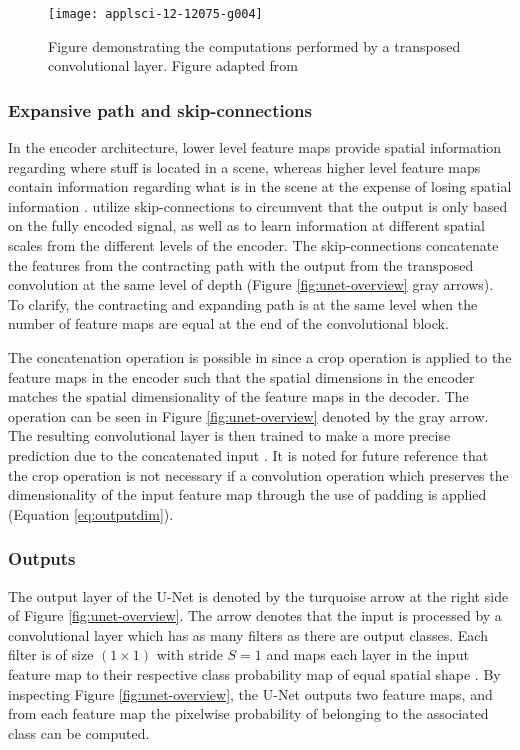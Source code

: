 \documentclass[../main/thesis.tex]{subfiles}
\begin{document}
\begin{figure}
    \centering
    \texttt{[image: applsci-12-12075-g004]}
    \caption{\label{fig:tconv}Figure demonstrating the computations performed by a transposed convolutional layer. Figure adapted from \protect\citet{Wu2022}}
\end{figure}

\subsubsection{Expansive path and skip-connections}
In the encoder architecture, lower level feature maps provide spatial information regarding where stuff is located in a scene, whereas higher level feature maps contain information regarding what is in the scene at the expense of losing spatial information \citep{Long2015}. \citet{Ronneberger2015} utilize skip-connections to circumvent that the output is only based on the fully encoded signal, as well as to learn information at different spatial scales from the different levels of the encoder. The skip-connections concatenate the features from the contracting path with the output from the transposed convolution at the same level of depth (Figure \ref{fig:unet-overview} gray arrows). To clarify, the contracting and expanding path is at the same level when the number of feature maps are equal at the end of the convolutional block. 

The concatenation operation is possible in \citet{Ronneberger2015} since a crop operation is applied to the feature maps in the encoder such that the spatial dimensions in the encoder matches the spatial dimensionality of the feature maps in the decoder. The operation can be seen in Figure \ref{fig:unet-overview} denoted by the gray arrow. The resulting convolutional layer is then trained to make a more precise prediction due to the concatenated input \citep{Ronneberger2015}. It is noted for future reference that the crop operation is not necessary if a convolution operation which preserves the dimensionality of the input feature map through the use of padding is applied (Equation \ref{eq:outputdim}).

\subsubsection{Outputs}
The output layer of the U-Net is denoted by the turquoise arrow at the right side of Figure \ref{fig:unet-overview}. The arrow denotes that the input is processed by a convolutional layer which has as many filters as there are output classes. Each filter is of size $(1 \times 1)$ with stride $S=1$ and maps each layer in the input feature map to their respective class probability map of equal spatial shape \citep{Ronneberger2015}. By inspecting Figure \ref{fig:unet-overview}, the U-Net outputs two feature maps, and from each feature map the pixelwise probability of belonging to the associated class can be computed.
\end{document}
